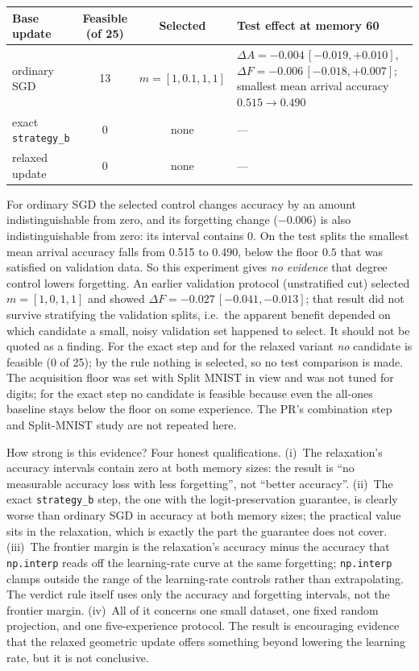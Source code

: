 \documentclass[11pt,a4paper]{article}
\newcommand{\code}[1]{\texttt{#1}}
\begin{document}
\begin{center}\small
\begin{tabular}{@{}lccp{6.6cm}@{}}
\toprule
Base update & Feasible (of 25) & Selected & Test effect at memory 60\\
\midrule
ordinary SGD & 13 & $m=[1,0.1,1,1]$ & $\Delta A=-0.004\,[-0.019,+0.010]$, $\Delta F=-0.006\,[-0.018,+0.007]$; smallest mean arrival accuracy $0.515\to0.490$\\
exact \code{strategy\_b} & 0 & none & ---\\
relaxed update & 0 & none & ---\\
\bottomrule
\end{tabular}
\end{center}
For ordinary SGD the selected control changes accuracy by an amount indistinguishable from zero, and its forgetting change ($-0.006$) is also indistinguishable from zero: its interval contains $0$. On the test splits the smallest mean arrival accuracy falls from 0.515 to 0.490, below the floor $0.5$ that was satisfied on validation data. So this experiment gives \emph{no evidence} that degree control lowers forgetting. An earlier validation protocol (unstratified cut) selected $m=[1,0,1,1]$ and showed $\Delta F=-0.027\,[-0.041,-0.013]$; that result did not survive stratifying the validation splits, i.e.\ the apparent benefit depended on which candidate a small, noisy validation set happened to select. It should not be quoted as a finding. For the exact step and for the relaxed variant \emph{no} candidate is feasible (0 of 25); by the rule nothing is selected, so no test comparison is made. The acquisition floor was set with Split MNIST in view and was not tuned for digits; for the exact step no candidate is feasible because even the all-ones baseline stays below the floor on some experience. The PR's combination step and Split-MNIST study are not repeated here.

\begin{reviewbox}
How strong is this evidence? Four honest qualifications. (i)~The relaxation's accuracy intervals contain zero at both memory sizes: the result is ``no measurable accuracy loss with less forgetting'', not ``better accuracy''. (ii)~The exact \code{strategy\_b} step, the one with the logit-preservation guarantee, is clearly worse than ordinary SGD in accuracy at both memory sizes; the practical value sits in the relaxation, which is exactly the part the guarantee does not cover. (iii)~The frontier margin is the relaxation's accuracy minus the accuracy that \code{np.interp} reads off the learning-rate curve at the same forgetting; \code{np.interp} clamps outside the range of the learning-rate controls rather than extrapolating. The verdict rule itself uses only the accuracy and forgetting intervals, not the frontier margin. (iv)~All of it concerns one small dataset, one fixed random projection, and one five-experience protocol. The result is encouraging evidence that the relaxed geometric update offers something beyond lowering the learning rate, but it is not conclusive.
\end{reviewbox}
\end{document}
